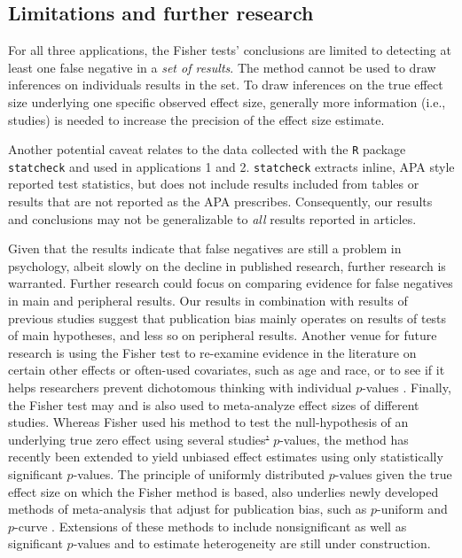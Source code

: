 \documentclass{article}
\providecommand{\DIFaddtex}[1]{{\protect\color{blue}\uwave{#1}}} %
\providecommand{\DIFdeltex}[1]{{\protect\color{red}\sout{#1}}}                      %
\providecommand{\DIFaddbegin}{} %
\providecommand{\DIFaddend}{} %
\providecommand{\DIFdelbegin}{} %
\providecommand{\DIFdelend}{} %
\providecommand{\DIFadd}[1]{\texorpdfstring{\DIFaddtex{#1}}{#1}} %
\providecommand{\DIFdel}[1]{\texorpdfstring{\DIFdeltex{#1}}{}} %
\begin{document}
\subsection*{Limitations and further research}

For all three applications, the Fisher tests' conclusions are limited to detecting at least one false negative in a \textit{set of results}. The method cannot be used to draw inferences on individuals results in the set. To draw inferences on the true effect size underlying one specific observed effect size, generally more information (i.e., studies) is needed to increase the precision of the effect size estimate.

Another potential caveat relates to the data collected with the \texttt{R} package \texttt{statcheck} and used in applications 1 and 2. \texttt{statcheck} extracts inline, APA style reported test statistics, but does not include results included from tables or results that are not reported as the APA prescribes. Consequently, our results and conclusions may not be generalizable to \textit{all} results reported in articles. 

Given that the results indicate that false negatives are still a problem in psychology, albeit slowly on the decline in published research, further research is warranted. Further research could focus on comparing evidence for false negatives in main and peripheral results. Our results in combination with results of previous studies suggest that publication bias mainly operates on results of tests of main hypotheses, and less so on peripheral results. Another venue for future research is using the Fisher test to re-examine evidence in the literature on certain other effects or often-used covariates, such as age and race, or to see if it helps researchers prevent dichotomous thinking with individual $p$-values \cite{Hoekstra2006}. Finally, the Fisher test may and is also used to meta-analyze effect sizes of different studies. Whereas Fisher used his method to test the null-hypothesis of an underlying true zero effect using several studies\DIFdelbegin \DIFdel{’ }\DIFdelend \DIFaddbegin \DIFadd{' }\DIFaddend $p$-values, the method has recently been extended to yield unbiased effect estimates using only statistically significant $p$-values. The principle of uniformly distributed $p$-values given the true effect size on which the Fisher method is based, also underlies newly developed methods of meta-analysis that adjust for publication bias, such as $p$-uniform \cite{Van_Assen2015-gg} and $p$-curve \cite{Simonsohn2014-dm}. Extensions of these methods to include nonsignificant as well as significant $p$-values and to estimate heterogeneity are still under construction.
\end{document}
